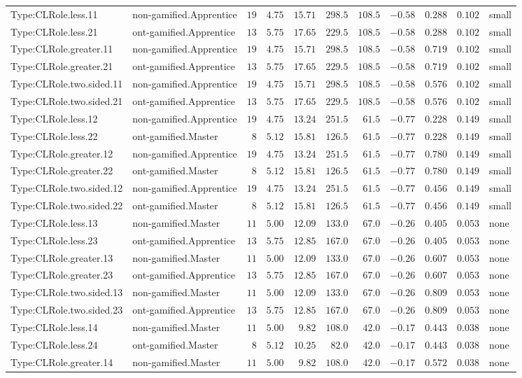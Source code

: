 \documentclass[6pt,a4paper]{article}
\begin{document}
{\begin{longtable}{llrrrrrrrrl}
Type:CLRole.less.11&non-gamified.Apprentice&$19$&$4.75$&$15.71$&$298.5$&$108.5$&$-0.58$&$0.288$&$0.102$&small\tabularnewline
Type:CLRole.less.21&ont-gamified.Apprentice&$13$&$5.75$&$17.65$&$229.5$&$108.5$&$-0.58$&$0.288$&$0.102$&small\tabularnewline
Type:CLRole.greater.11&non-gamified.Apprentice&$19$&$4.75$&$15.71$&$298.5$&$108.5$&$-0.58$&$0.719$&$0.102$&small\tabularnewline
Type:CLRole.greater.21&ont-gamified.Apprentice&$13$&$5.75$&$17.65$&$229.5$&$108.5$&$-0.58$&$0.719$&$0.102$&small\tabularnewline
Type:CLRole.two.sided.11&non-gamified.Apprentice&$19$&$4.75$&$15.71$&$298.5$&$108.5$&$-0.58$&$0.576$&$0.102$&small\tabularnewline
Type:CLRole.two.sided.21&ont-gamified.Apprentice&$13$&$5.75$&$17.65$&$229.5$&$108.5$&$-0.58$&$0.576$&$0.102$&small\tabularnewline
Type:CLRole.less.12&non-gamified.Apprentice&$19$&$4.75$&$13.24$&$251.5$&$ 61.5$&$-0.77$&$0.228$&$0.149$&small\tabularnewline
Type:CLRole.less.22&ont-gamified.Master&$ 8$&$5.12$&$15.81$&$126.5$&$ 61.5$&$-0.77$&$0.228$&$0.149$&small\tabularnewline
Type:CLRole.greater.12&non-gamified.Apprentice&$19$&$4.75$&$13.24$&$251.5$&$ 61.5$&$-0.77$&$0.780$&$0.149$&small\tabularnewline
Type:CLRole.greater.22&ont-gamified.Master&$ 8$&$5.12$&$15.81$&$126.5$&$ 61.5$&$-0.77$&$0.780$&$0.149$&small\tabularnewline
Type:CLRole.two.sided.12&non-gamified.Apprentice&$19$&$4.75$&$13.24$&$251.5$&$ 61.5$&$-0.77$&$0.456$&$0.149$&small\tabularnewline
Type:CLRole.two.sided.22&ont-gamified.Master&$ 8$&$5.12$&$15.81$&$126.5$&$ 61.5$&$-0.77$&$0.456$&$0.149$&small\tabularnewline
Type:CLRole.less.13&non-gamified.Master&$11$&$5.00$&$12.09$&$133.0$&$ 67.0$&$-0.26$&$0.405$&$0.053$&none\tabularnewline
Type:CLRole.less.23&ont-gamified.Apprentice&$13$&$5.75$&$12.85$&$167.0$&$ 67.0$&$-0.26$&$0.405$&$0.053$&none\tabularnewline
Type:CLRole.greater.13&non-gamified.Master&$11$&$5.00$&$12.09$&$133.0$&$ 67.0$&$-0.26$&$0.607$&$0.053$&none\tabularnewline
Type:CLRole.greater.23&ont-gamified.Apprentice&$13$&$5.75$&$12.85$&$167.0$&$ 67.0$&$-0.26$&$0.607$&$0.053$&none\tabularnewline
Type:CLRole.two.sided.13&non-gamified.Master&$11$&$5.00$&$12.09$&$133.0$&$ 67.0$&$-0.26$&$0.809$&$0.053$&none\tabularnewline
Type:CLRole.two.sided.23&ont-gamified.Apprentice&$13$&$5.75$&$12.85$&$167.0$&$ 67.0$&$-0.26$&$0.809$&$0.053$&none\tabularnewline
Type:CLRole.less.14&non-gamified.Master&$11$&$5.00$&$ 9.82$&$108.0$&$ 42.0$&$-0.17$&$0.443$&$0.038$&none\tabularnewline
Type:CLRole.less.24&ont-gamified.Master&$ 8$&$5.12$&$10.25$&$ 82.0$&$ 42.0$&$-0.17$&$0.443$&$0.038$&none\tabularnewline
Type:CLRole.greater.14&non-gamified.Master&$11$&$5.00$&$ 9.82$&$108.0$&$ 42.0$&$-0.17$&$0.572$&$0.038$&none\tabularnewline

\end{longtable}}
\end{document}
